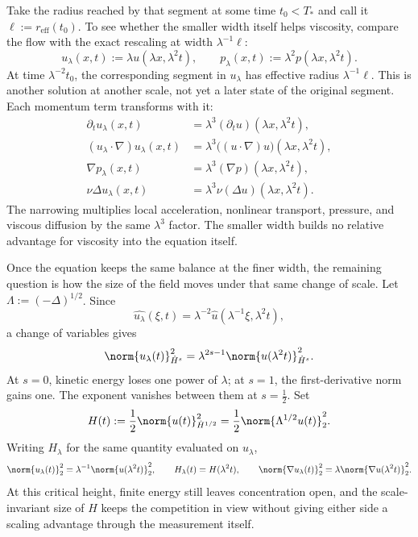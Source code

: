 
Take the radius reached by that segment at some time \(t_0<T_*\) and call it \(\ell:=r_{\mathrm{eff}}(t_0)\). To see whether the smaller width itself helps viscosity, compare the flow with the exact \NavierStokes{} rescaling at width \(\lambda^{-1}\ell\):
\[
  u_\lambda(x,t)
  :=
  \lambda u(\lambda x,\lambda^2t),
  \qquad
  p_\lambda(x,t)
  :=
  \lambda^2p(\lambda x,\lambda^2t).
\]
At time \(\lambda^{-2}t_0\), the corresponding segment in \(u_\lambda\) has effective radius \(\lambda^{-1}\ell\). This is another solution at another scale, not yet a later state of the original segment. Each momentum term transforms with it:
\[
\begin{aligned}
  \partial_tu_\lambda(x,t)
  &=
  \lambda^3(\partial_tu)(\lambda x,\lambda^2t),
  \\
  (u_\lambda\cdot\nabla)u_\lambda(x,t)
  &=
  \lambda^3\bigl((u\cdot\nabla)u\bigr)(\lambda x,\lambda^2t),
  \\
  \nabla p_\lambda(x,t)
  &=
  \lambda^3(\nabla p)(\lambda x,\lambda^2t),
  \\
  \nu\Delta u_\lambda(x,t)
  &=
  \lambda^3\nu(\Delta u)(\lambda x,\lambda^2t).
\end{aligned}
\]
The narrowing multiplies local acceleration, nonlinear transport, pressure, and viscous diffusion by the same \(\lambda^3\) factor. The smaller width builds no relative advantage for viscosity into the equation itself.


Once the equation keeps the same balance at the finer width, the remaining question is how the size of the field moves under that same change of scale. Let \(\Lambda:=(-\Delta)^{1/2}\). Since
\[
  \widehat{u_\lambda}(\xi,t)
  =
  \lambda^{-2}\widehat u(\lambda^{-1}\xi,\lambda^2t),
\]
a change of variables gives
\[
  \norm{u_\lambda(t)}_{\dot H^s}^2
  =
  \lambda^{2s-1}
  \norm{u(\lambda^2t)}_{\dot H^s}^2.
\]
At \(s=0\), kinetic energy loses one power of \(\lambda\); at \(s=1\), the first-derivative norm gains one. The exponent vanishes between them at \(s=\tfrac12\). Set
\[
  H(t)
  :=
  \frac12\norm{u(t)}_{\dot H^{1/2}}^2
  =
  \frac12\norm{\Lambda^{1/2}u(t)}_2^2.
\]
Writing \(H_\lambda\) for the same quantity evaluated on \(u_\lambda\),
\[
  \norm{u_\lambda(t)}_2^2
  =
  \lambda^{-1}\norm{u(\lambda^2t)}_2^2,
  \qquad
  H_\lambda(t)=H(\lambda^2t),
  \qquad
  \norm{\nabla u_\lambda(t)}_2^2
  =
  \lambda\norm{\nabla u(\lambda^2t)}_2^2.
\]
At this critical height, finite energy still leaves concentration open, and the scale-invariant size of \(H\) keeps the competition in view without giving either side a scaling advantage through the measurement itself.

